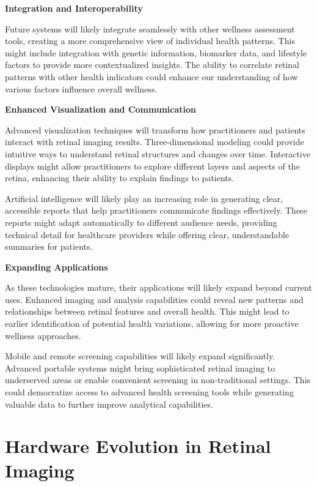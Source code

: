 \documentclass[
  Letterpaper,
]{scrbook}
\begin{document}
\textbf{Integration and Interoperability}

Future systems will likely integrate seamlessly with other wellness
assessment tools, creating a more comprehensive view of individual
health patterns. This might include integration with genetic
information, biomarker data, and lifestyle factors to provide more
contextualized insights. The ability to correlate retinal patterns with
other health indicators could enhance our understanding of how various
factors influence overall wellness.

\textbf{Enhanced Visualization and Communication}

Advanced visualization techniques will transform how practitioners and
patients interact with retinal imaging results. Three-dimensional
modeling could provide intuitive ways to understand retinal structures
and changes over time. Interactive displays might allow practitioners to
explore different layers and aspects of the retina, enhancing their
ability to explain findings to patients.

Artificial intelligence will likely play an increasing role in
generating clear, accessible reports that help practitioners communicate
findings effectively. These reports might adapt automatically to
different audience needs, providing technical detail for healthcare
providers while offering clear, understandable summaries for patients.

\textbf{Expanding Applications}

As these technologies mature, their applications will likely expand
beyond current uses. Enhanced imaging and analysis capabilities could
reveal new patterns and relationships between retinal features and
overall health. This might lead to earlier identification of potential
health variations, allowing for more proactive wellness approaches.

Mobile and remote screening capabilities will likely expand
significantly. Advanced portable systems might bring sophisticated
retinal imaging to underserved areas or enable convenient screening in
non-traditional settings. This could democratize access to advanced
health screening tools while generating valuable data to further improve
analytical capabilities.

\section{Hardware Evolution in Retinal
Imaging}\label{hardware-evolution-in-retinal-imaging}
\end{document}
